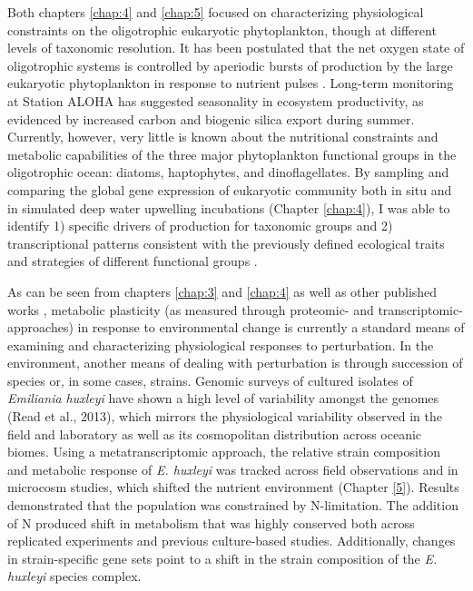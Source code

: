 Both chapters \ref{chap:4} and \ref{chap:5} focused on characterizing physiological constraints on the oligotrophic eukaryotic phytoplankton, though at different levels of taxonomic resolution. It has been postulated that the net oxygen state of oligotrophic systems is controlled by aperiodic bursts of production by the large eukaryotic phytoplankton in response to nutrient pulses \citep{Karl2003}. Long-term monitoring at Station ALOHA has suggested seasonality in ecosystem productivity, as evidenced by increased carbon and biogenic silica export during summer. Currently, however, very little is known about the nutritional constraints and metabolic capabilities of the three major phytoplankton functional groups in the oligotrophic ocean: diatoms, haptophytes, and dinoflagellates. By sampling and comparing the global gene expression of eukaryotic community both in situ and in simulated deep water upwelling incubations (Chapter \ref{chap:4}), I was able to identify 1) specific drivers of production for taxonomic groups and 2) transcriptional patterns consistent with the previously defined ecological traits and strategies of different functional groups \citep{Margalef1978}. \par

As can be seen from chapters \ref{chap:3} and \ref{chap:4} as well as other published works \citep{Dyhrman2006, Dyhrman2012, Wurch2011, Bertrand2012a, Jones2013, Bender2014, Frischkorn2014}, metabolic plasticity (as measured through proteomic- and transcriptomic-approaches) in response to environmental change is currently a standard means of examining and characterizing physiological responses to perturbation. In the environment, another means of dealing with perturbation is through succession of species or, in some cases, strains. Genomic surveys of cultured isolates of \textit{Emiliania huxleyi} have shown a high level of variability amongst the genomes (Read et al., 2013), which mirrors the physiological variability observed in the field and laboratory as well as its cosmopolitan distribution across oceanic biomes. Using a metatranscriptomic approach, the relative strain composition and metabolic response of \textit{E. huxleyi} was tracked across field observations and in microcosm studies, which shifted the nutrient environment (Chapter \ref{5}). Results demonstrated that the population was constrained by N-limitation. The addition of N produced shift in metabolism that was highly conserved both across replicated experiments and previous culture-based studies. Additionally, changes in strain-specific gene sets point to a shift in the strain composition of the \textit{E. huxleyi} species complex. 
